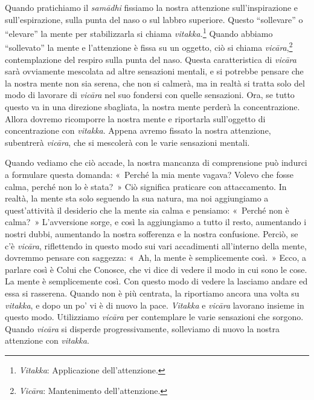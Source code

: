Quando pratichiamo il \emph{samādhi} fissiamo la nostra attenzione
sull'inspirazione e sull'espirazione, sulla punta del naso o sul labbro
superiore. Questo ``sollevare'' o ``elevare'' la mente per stabilizzarla
si chiama \emph{vitakka.}\footnote{\emph{Vitakka}: Applicazione
  dell'attenzione.} Quando abbiamo ``sollevato'' la mente e l'attenzione
è fissa su un oggetto, ciò si chiama \emph{vicāra},\footnote{\emph{Vicāra}:
  Mantenimento dell'attenzione.} contemplazione del respiro sulla punta
del naso. Questa caratteristica di \emph{vicāra} sarà ovviamente
mescolata ad altre sensazioni mentali, e si potrebbe pensare che la
nostra mente non sia serena, che non si calmerà, ma in realtà si tratta
solo del modo di lavorare di \emph{vicāra} nel suo fondersi con quelle
sensazioni. Ora, se tutto questo va in una direzione sbagliata, la
nostra mente perderà la concentrazione. Allora dovremo ricomporre la
nostra mente e riportarla sull'oggetto di concentrazione con
\emph{vitakka}. Appena avremo fissato la nostra attenzione, subentrerà
\emph{vicāra}, che si mescolerà con le varie sensazioni mentali.

Quando vediamo che ciò accade, la nostra mancanza di comprensione può
indurci a formulare questa domanda: «~Perché la mia mente vagava? Volevo
che fosse calma, perché non lo è stata?~» Ciò significa praticare con
attaccamento. In realtà, la mente sta solo seguendo la sua natura, ma
noi aggiungiamo a quest'attività il desiderio che la mente sia calma e
pensiamo: «~Perché non è calma?~» L'avversione sorge, e così la
aggiungiamo a tutto il resto, aumentando i nostri dubbi, aumentando la
nostra sofferenza e la nostra confusione. Perciò, se c'è \emph{vicāra},
riflettendo in questo modo sui vari accadimenti all'interno della mente,
dovremmo pensare con saggezza: «~Ah, la mente è semplicemente così.~»
Ecco, a parlare così è Colui che Conosce, che vi dice di vedere il modo
in cui sono le cose. La mente è semplicemente così. Con questo modo di
vedere la lasciamo andare ed essa si rasserena. Quando non è più
centrata, la riportiamo ancora una volta su \emph{vitakka}, e dopo un
po' vi è di nuovo la pace. \emph{Vitakka} e \emph{vicāra} lavorano
insieme in questo modo. Utilizziamo \emph{vicāra} per contemplare le
varie sensazioni che sorgono. Quando \emph{vicāra} si disperde
progressivamente, solleviamo di nuovo la nostra attenzione con
\emph{vitakka}.

